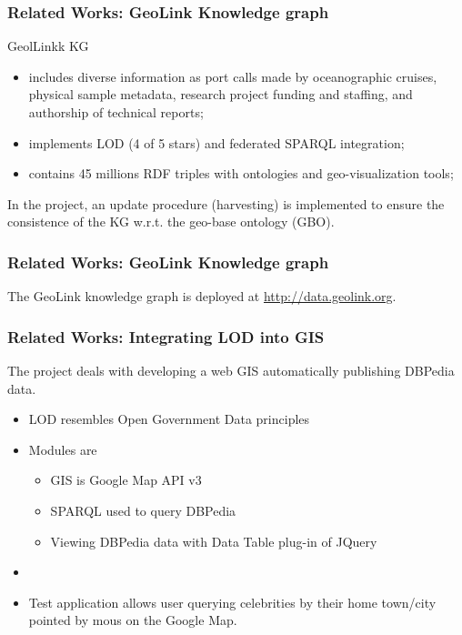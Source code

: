 \documentclass[10pt]{beamer}
\begin{document}
\begin{frame}[fragile]
  \frametitle{Related Works: GeoLink Knowledge graph}
  GeolLinkk KG \cite{geolink}
  \begin{itemize}
  \item includes diverse information as port calls made by oceanographic cruises, physical sample metadata, research project funding and staffing, and authorship of technical reports;
  \item implements LOD (4 of 5 stars) and federated SPARQL integration;
  \item contains 45 millions RDF triples with ontologies and geo-visualization tools;
  \end{itemize}
  In the project, an update procedure (harvesting) is implemented to ensure the consistence of the KG w.r.t. the geo-base ontology (GBO).
\end{frame}

\begin{frame}
  \frametitle{Related Works: GeoLink Knowledge graph}
  The GeoLink knowledge graph is deployed at \url{http://data.geolink.org}.
\end{frame}



\begin{frame}
  \frametitle{Related Works: Integrating LOD into GIS}
  The project \cite{abid} deals with developing a web GIS automatically publishing DBPedia data.
  \begin{itemize}
  \item LOD resembles Open Government Data principles
  \item Modules are
    \begin{itemize}
    \item GIS is Google Map API v3
    \item SPARQL used to query DBPedia
    \item Viewing DBPedia data with Data Table plug-in of JQuery
    \end{itemize}
  \item
  \item Test application allows user querying celebrities by their home town/city pointed by mous on the Google Map.
  \end{itemize}
\end{frame}
\end{document}
